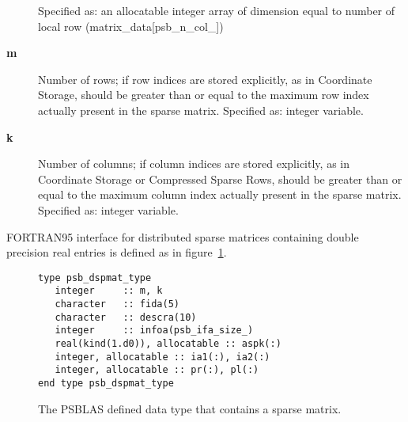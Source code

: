 \begin{description}
Specified as: an allocatable integer array of dimension equal to number of
local row (matrix\_data[psb\_n\_col\_\hbox{]})
\item[{\bf m}] Number of rows; if row indices are stored explicitly,
as in Coordinate Storage, should be greater than or equal to the
maximum row index actually present in the sparse matrix.
Specified as: integer variable.
\item[{\bf k}] Number of columns; if column indices are stored explicitly,
as in Coordinate Storage or Compressed Sparse Rows, should be greater
than or equal to the maximum column  index actually present in the sparse matrix.
Specified as: integer variable.
\end{description}
FORTRAN95 interface for distributed sparse matrices containing double precision
real entries is defined as in figure~\ref{fig:spmattype}.
\begin{figure}[h!]
  \begin{Sbox}
    \begin{minipage}[tl]{0.85\textwidth}
\begin{verbatim}
type psb_dspmat_type
   integer     :: m, k
   character   :: fida(5)
   character   :: descra(10)
   integer     :: infoa(psb_ifa_size_)
   real(kind(1.d0)), allocatable :: aspk(:)
   integer, allocatable :: ia1(:), ia2(:)
   integer, allocatable :: pr(:), pl(:)
end type psb_dspmat_type
\end{verbatim}
    \end{minipage}
  \end{Sbox}
  \setlength{\fboxsep}{8pt}
  \begin{center}
    \fbox{\TheSbox}
  \end{center}
  \caption{\label{fig:spmattype} 
    The PSBLAS defined data type that
    contains a sparse matrix.} 
\end{figure}

